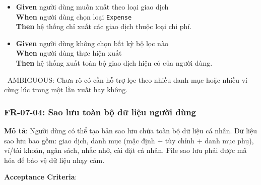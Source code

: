 \begin{itemize}
\item \textbf{Given} người dùng muốn xuất theo loại giao dịch  \\ \hspace*{1.5em}  \textbf{When} người dùng chọn loại \texttt{Expense}  \\ \hspace*{1.5em}  \textbf{Then} hệ thống chỉ xuất các giao dịch thuộc loại chi phí.
\item \textbf{Given} người dùng không chọn bất kỳ bộ lọc nào  \\ \hspace*{1.5em}  \textbf{When} người dùng thực hiện xuất  \\ \hspace*{1.5em}  \textbf{Then} hệ thống xuất toàn bộ giao dịch hiện có của người dùng.
\end{itemize}
\warningicon\  AMBIGUOUS: Chưa rõ có cần hỗ trợ lọc theo nhiều danh mục hoặc nhiều ví cùng lúc trong một lần xuất hay không.



\subsubsection{FR-07-04: Sao lưu toàn bộ dữ liệu người dùng}

\textbf{Mô tả}: Người dùng có thể tạo bản sao lưu chứa toàn bộ dữ liệu cá nhân. Dữ liệu sao lưu bao gồm: giao dịch, danh mục (mặc định + tùy chỉnh + danh mục phụ), ví/tài khoản, ngân sách, nhắc nhở, cài đặt cá nhân. File sao lưu phải được mã hóa để bảo vệ dữ liệu nhạy cảm.



\textbf{Acceptance Criteria}:

